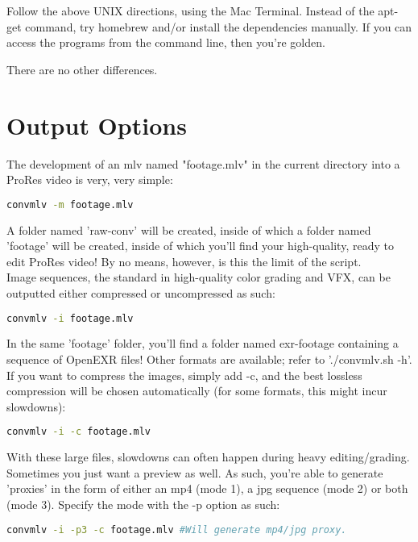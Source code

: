\documentclass[a4paper,12pt]{article}
\begin{document}
		Follow the above UNIX directions, using the Mac Terminal. Instead of the apt-get command, try homebrew and/or install the dependencies manually.
		If you can access the programs from the command line, then you're golden.
		
		There are no other differences.

\section{Output Options}

	The development of an mlv named "footage.mlv" in the current directory into a ProRes video is very, very simple:
	
\begin{lstlisting}[language=bash]
	convmlv -m footage.mlv
\end{lstlisting}

	A folder named 'raw-conv' will be created, inside of which a folder named 'footage' will be created, inside of which you'll find your
	high-quality, ready to edit ProRes video! By no means, however, is this the limit of the script.\\
	
	Image sequences, the standard in high-quality color grading and VFX, can be outputted either compressed or uncompressed as such:
	
\begin{lstlisting}[language=bash]
	convmlv -i footage.mlv
\end{lstlisting}

	In the same 'footage' folder, you'll find a folder named exr-footage containing a sequence of OpenEXR files! Other formats
	are available; refer to './convmlv.sh -h'. If you want to compress the images, simply add -c, and the best lossless compression will
	be chosen automatically (for some formats, this might incur slowdowns):
	
\begin{lstlisting}[language=bash]
	convmlv -i -c footage.mlv
\end{lstlisting}

	With these large files, slowdowns can often happen during heavy editing/grading. Sometimes you just want a preview as well.
	As such, you're able to generate 'proxies' in the form of either an mp4 (mode 1), a jpg sequence (mode 2) or both (mode 3). Specify
	the mode with the -p option as such:
	
\begin{lstlisting}[language=bash]
	convmlv -i -p3 -c footage.mlv #Will generate mp4/jpg proxy.
\end{lstlisting}
\end{document}
